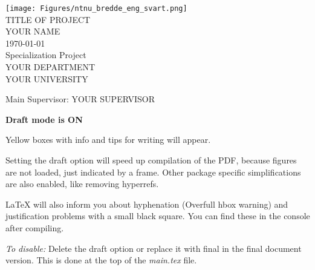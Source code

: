 \thispagestyle{empty}
\texttt{[image: Figures/ntnu\_bredde\_eng\_svart.png]}
\mbox{}\\[6pc]

\Huge{TITLE OF PROJECT}\\[2pc]

\Large{YOUR NAME}\\[1pc]
\large{\monthyeardate\today}\\[2pc]

Specialization Project\\
YOUR DEPARTMENT\\
YOUR UNIVERSITY

\vfill

\noindent Main Supervisor: YOUR SUPERVISOR


\begin{info}
	\textbf{Draft mode is ON}

	Yellow boxes with info and tips for writing will appear.

	Setting the draft option will speed up compilation of the PDF, because figures are not loaded, just indicated by a frame. Other package specific simplifications are also enabled, like removing hyperrefs. 

	LaTeX will also inform you about hyphenation (Overfull hbox warning) and justification problems with a small black square. You can find these in the console after compiling.

	\emph{To disable:} Delete the draft option or replace it with final in the final document version. This is done at the top of the \emph{main.tex} file.
\end{info}
